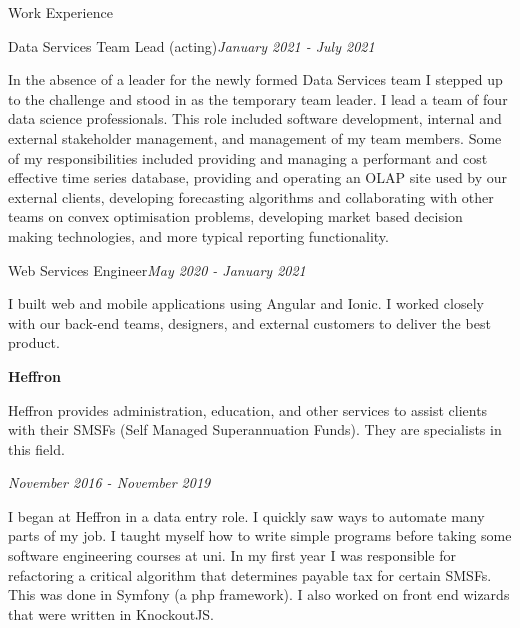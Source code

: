 \documentclass{resume} %
\begin{document}
\begin{rSection}{Work Experience}
\begin{adjustwidth}{2em}{}
        \begin{rSubsection}{Data Services Team Lead (acting)}{\em January 2021 - July 2021}{}{}
            \item In the absence of a leader for the newly formed Data Services team I stepped up to the
            challenge and stood in as the temporary team leader. I lead a team of four data science
            professionals. This role included software development, internal and external stakeholder
            management, and management of my team members. Some of my responsibilities included providing
            and managing a performant and cost effective time series database, providing and operating an
            OLAP site used by our external clients, developing forecasting algorithms and collaborating
            with other teams on convex optimisation problems, developing market based decision making
            technologies, and more typical reporting functionality.
        \end{rSubsection}

        \begin{rSubsection}{Web Services Engineer}{\em May 2020 - January 2021}{}{}
            \item I built web and mobile applications using Angular and Ionic.
            I worked closely with our back-end teams, designers, and external customers
            to deliver the best product.
        \end{rSubsection}
    \end{adjustwidth}

    {\bf Heffron}

    Heffron provides administration, education, and other services to assist clients with their
    SMSFs (Self Managed Superannuation Funds). They are specialists in this field.

    \begin{adjustwidth}{2em}{}
        \begin{rSubsection}{}{\em November 2016 - November 2019}{}{}
            \item
            I began at Heffron in a data entry role. I quickly saw ways to automate many parts of my job.
            I taught myself how to write simple programs before taking some software engineering courses at uni.
            In my first year I was responsible for refactoring a critical algorithm that determines payable
            tax for certain SMSFs. This was done in Symfony (a php framework).
            I also worked on front end wizards that were written in KnockoutJS.


\end{rSubsection}
\end{adjustwidth}
\end{rSection}
\end{document}
